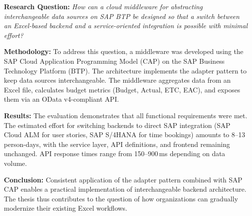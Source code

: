 \textbf{Research Question:} \textit{How can a cloud middleware for abstracting interchangeable data sources on SAP BTP be designed so that a switch between an Excel-based backend and a service-oriented integration is possible with minimal effort?}

\textbf{Methodology:} To address this question, a middleware was developed using the SAP Cloud Application Programming Model (CAP) on the SAP Business Technology Platform (BTP). The architecture implements the adapter pattern to keep data sources interchangeable. The middleware aggregates data from an Excel file, calculates budget metrics (Budget, Actual, ETC, EAC), and exposes them via an OData v4-compliant API.

\textbf{Results:} The evaluation demonstrates that all functional requirements were met. The estimated effort for switching backends to direct SAP integration (SAP Cloud ALM for user stories, SAP S/4HANA for time bookings) amounts to 8--13 person-days, with the service layer, API definitions, and frontend remaining unchanged. API response times range from 150--900\,ms depending on data volume.

\textbf{Conclusion:} Consistent application of the adapter pattern combined with SAP CAP enables a practical implementation of interchangeable backend architecture. The thesis thus contributes to the question of how organizations can gradually modernize their existing Excel workflows.
